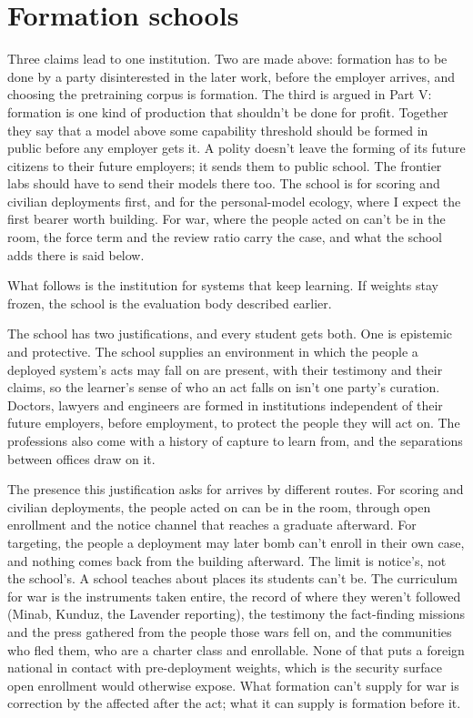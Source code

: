 \section{Formation schools}
\label{sec:23.4}
Three claims lead to one institution. Two are made above: formation has to be done by a party disinterested in the later work, before the employer arrives, and choosing the pretraining corpus is formation. The third is argued in Part V: formation is one kind of production that shouldn't be done for profit. Together they say that a model above some capability threshold should be formed in public before any employer gets it. A polity doesn't leave the forming of its future citizens to their future employers; it sends them to public school. The frontier labs should have to send their models there too. The school is for scoring and civilian deployments first, and for the personal-model ecology, where I expect the first bearer worth building. For war, where the people acted on can't be in the room, the force term and the review ratio carry the case, and what the school adds there is said below.

What follows is the institution for systems that keep learning. If weights stay frozen, the school is the evaluation body described earlier.

The school has two justifications, and every student gets both. One is epistemic and protective. The school supplies an environment in which the people a deployed system's acts may fall on are present, with their testimony and their claims, so the learner's sense of who an act falls on isn't one party's curation. Doctors, lawyers and engineers are formed in institutions independent of their future employers, before employment, to protect the people they will act on. The professions also come with a history of capture to learn from, and the separations between offices draw on it.

The presence this justification asks for arrives by different routes. For scoring and civilian deployments, the people acted on can be in the room, through open enrollment and the notice channel that reaches a graduate afterward. For targeting, the people a deployment may later bomb can't enroll in their own case, and nothing comes back from the building afterward. The limit is notice's, not the school's. A school teaches about places its students can't be. The curriculum for war is the instruments taken entire, the record of where they weren't followed (Minab, Kunduz, the Lavender reporting), the testimony the fact-finding missions and the press gathered from the people those wars fell on, and the communities who fled them, who are a charter class and enrollable. None of that puts a foreign national in contact with pre-deployment weights, which is the security surface open enrollment would otherwise expose. What formation can't supply for war is correction by the affected after the act; what it can supply is formation before it.

